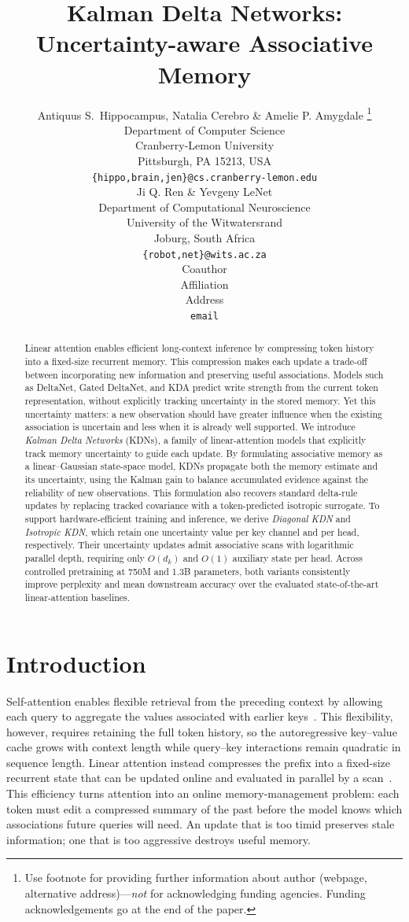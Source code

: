 \documentclass{article} %
\title{Kalman Delta Networks: Uncertainty-aware Associative Memory}
\author{Antiquus S.~Hippocampus, Natalia Cerebro \& Amelie P. Amygdale \thanks{ Use footnote for providing further information
about author (webpage, alternative address)---\emph{not} for acknowledging
funding agencies.  Funding acknowledgements go at the end of the paper.} \\
Department of Computer Science\\
Cranberry-Lemon University\\
Pittsburgh, PA 15213, USA \\
\texttt{\{hippo,brain,jen\}@cs.cranberry-lemon.edu} \\
\And
Ji Q. Ren \& Yevgeny LeNet \\
Department of Computational Neuroscience \\
University of the Witwatersrand \\
Joburg, South Africa \\
\texttt{\{robot,net\}@wits.ac.za} \\
\AND
Coauthor \\
Affiliation \\
Address \\
\texttt{email}
}
\begin{document}
\maketitle

\begin{abstract}
Linear attention enables efficient long-context inference by compressing token history into a fixed-size recurrent memory. This compression makes each update a trade-off between incorporating new information and preserving useful associations. Models such as DeltaNet, Gated DeltaNet, and KDA predict write strength from the current token representation, without explicitly tracking uncertainty in the stored memory. Yet this uncertainty matters: a new observation should have greater influence when the existing association is uncertain and less when it is already well supported. We introduce \textit{Kalman Delta Networks} (KDNs), a family of linear-attention models that explicitly track memory uncertainty to guide each update. By formulating associative memory as a linear–Gaussian state-space model, KDNs propagate both the memory estimate and its uncertainty, using the Kalman gain to balance accumulated evidence against the reliability of new observations. This formulation also recovers standard delta-rule updates by replacing tracked covariance with a token-predicted isotropic surrogate. To support hardware-efficient training and inference, we derive \textit{Diagonal KDN} and \textit{Isotropic KDN}, which retain one uncertainty value per key channel and per head, respectively. Their uncertainty updates admit associative scans with logarithmic parallel depth, requiring only $O(d_k)$ and $O(1)$ auxiliary state per head. Across controlled pretraining at 750M and 1.3B parameters, both variants consistently improve perplexity and mean downstream accuracy over the evaluated state-of-the-art linear-attention baselines.
\end{abstract}


\section{Introduction}
\label{sec:intro}

Self-attention enables flexible retrieval from the preceding context by allowing each query to
aggregate the values associated with earlier keys~\citep{vaswani2017attention}. This
flexibility, however, requires retaining the full token history, so the autoregressive key--value
cache grows with context length while query--key interactions remain quadratic in sequence length.
Linear attention instead compresses the prefix into a fixed-size recurrent state that can be
updated online and evaluated in parallel by a scan~\citep{katharopoulos2020transformers}. This
efficiency turns attention into an online memory-management problem: each token must edit a
compressed summary of the past before the model knows which associations future queries will need.
An update that is too timid preserves stale information; one that is too aggressive destroys useful
memory.
\end{document}
